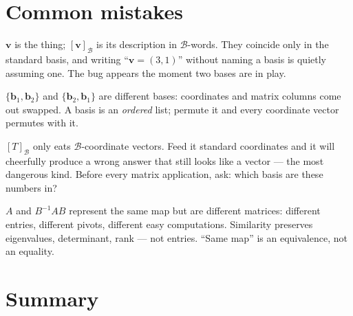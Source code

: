 \section{Common mistakes}\label{sec:mistakes4}

\begin{tripwire}
$\mathbf v$ is the thing; $[\mathbf v]_{\mathcal B}$ is its description in $\mathcal B$-words. They coincide only in the standard basis, and writing ``$\mathbf v=(3,1)$'' without naming a basis is quietly assuming one. The bug appears the moment two bases are in play.
\end{tripwire}
\begin{tripwire}
$\{\mathbf b_1,\mathbf b_2\}$ and $\{\mathbf b_2,\mathbf b_1\}$ are different bases: coordinates and matrix columns come out swapped. A basis is an \emph{ordered} list; permute it and every coordinate vector permutes with it.
\end{tripwire}
\begin{tripwire}
$[T]_{\mathcal B}$ only eats $\mathcal B$-coordinate vectors. Feed it standard coordinates and it will cheerfully produce a wrong answer that still looks like a vector — the most dangerous kind. Before every matrix application, ask: which basis are these numbers in?
\end{tripwire}
\begin{tripwire}
$A$ and $B^{-1}AB$ represent the same map but are different matrices: different entries, different pivots, different easy computations. Similarity preserves eigenvalues, determinant, rank — not entries. ``Same map'' is an equivalence, not an equality.
\end{tripwire}

\section{Summary}\label{sec:ch4summary}

